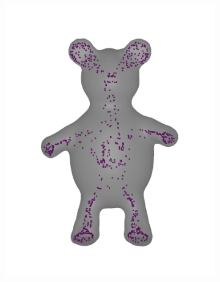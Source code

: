 \documentclass[review]{acmsiggraph}
\begin{document}
\begin{figure}
\begin{subfigure}[b]{0.19\linewidth}
                \includegraphics[width=\textwidth]{images/bear/3.pdf}
        \end{subfigure}
~
		\begin{subfigure}[b]{0.19\linewidth}
                \centering

\end{subfigure}
\end{figure}
\end{document}
